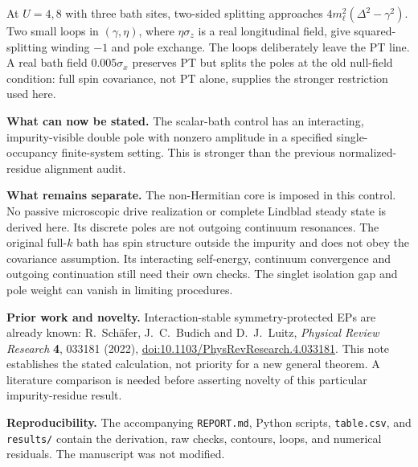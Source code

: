 \documentclass[11pt,a4paper]{article}
\begin{document}
At $U=4,8$ with three bath sites, two-sided splitting approaches
$4m_\ell^2(\Delta^2-\gamma^2)$. Two small loops in
$(\gamma,\eta)$, where $\eta\sigma_z$ is a real longitudinal field, give
squared-splitting winding $-1$ and pole exchange. The loops deliberately
leave the PT line. A real bath field $0.005\sigma_x$ preserves PT but splits
the poles at the old null-field condition: full spin covariance, not PT
alone, supplies the stronger restriction used here.

\textbf{What can now be stated.} The scalar-bath control has an interacting,
impurity-visible double pole with nonzero amplitude in a specified
single-occupancy finite-system setting. This is stronger than the previous
normalized-residue alignment audit.

\textbf{What remains separate.} The non-Hermitian core is imposed in this
control. No passive microscopic drive realization or complete Lindblad
steady state is derived here. Its discrete poles are not outgoing continuum
resonances. The original full-$k$ bath has spin structure outside the impurity
and does not obey the covariance assumption. Its interacting self-energy,
continuum convergence and outgoing continuation still need their own checks.
The singlet isolation gap and pole weight can vanish in limiting procedures.

\textbf{Prior work and novelty.} Interaction-stable symmetry-protected EPs
are already known: R.~Sch\"afer, J.~C.~Budich and D.~J.~Luitz,
\emph{Physical Review Research} \textbf{4}, 033181 (2022),
\href{https://doi.org/10.1103/PhysRevResearch.4.033181}{doi:10.1103/PhysRevResearch.4.033181}.
This note establishes the stated calculation, not priority for a new general
theorem. A literature comparison is needed before asserting novelty of this
particular impurity-residue result.

\textbf{Reproducibility.} The accompanying \texttt{REPORT.md}, Python scripts,
\texttt{table.csv}, and \texttt{results/} contain the derivation, raw checks,
contours, loops, and numerical residuals. The manuscript was not modified.
\end{document}

